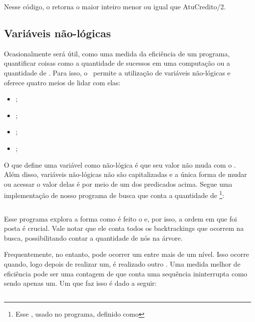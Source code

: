 \inputminted{prolog}{../Exemplos/Cap8/prog4_partilha2.pl}

Nesse código, o  retorna o maior inteiro menor ou igual que AtuCredito/2.

\subsection{Variáveis não-lógicas}

  Ocasionalmente será útil, como uma medida da eficiência de um programa, quantificar coisas como a quantidade de sucessos em uma computação ou a quantidade de . Para isso, o \eclipse\ permite a utilização de variáveis não-lógicas e oferece quatro meios de lidar com elas:

  \begin{itemize}
    \item {};
    \item {};
    \item {};
    \item {};
  \end{itemize}

  O que define uma variável como não-lógica é que seu valor não muda com o .
  Além disso, variáveis não-lógicas não são capitalizadas e a única forma de mudar ou acessar o
  valor delas é por meio de um dos predicados acima. Segue uma implementação de nosso programa de
  busca que conta a quantidade de \footnote{Esse , usado no programa, definido como }:

\inputminted{prolog}{../Exemplos/Cap8/prog5_busca3.pl}

Esse programa explora a forma como é feito o  e, por isso, a ordem em que foi posta é crucial. Vale notar que ele conta todos os backtrackings que ocorrem na busca, possibilitando contar a quantidade de nós na árvore.

Frequentemente, no entanto, pode ocorrer um  entre mais de um nível. Isso
ocorre quando, logo depois de realizar um, é realizado outro . Uma medida
melhor de eficiência pode ser uma contagem de  que conta uma sequência
ininterrupta como sendo apenas um. Um  que faz isso é dado a seguir:

\inputminted{prolog}{../Exemplos/Cap8/prog6_conta_backtrack.pl}

